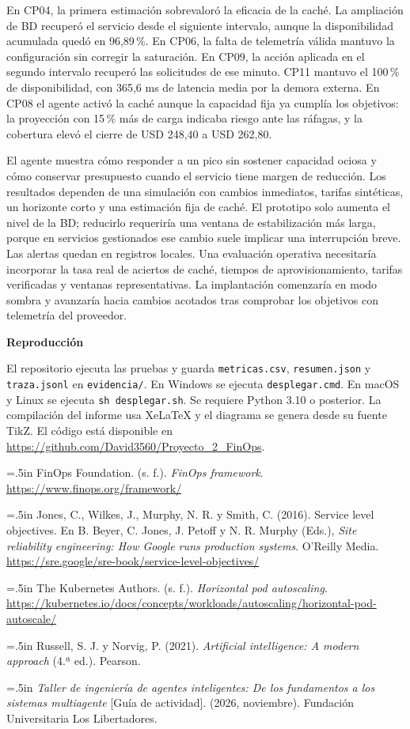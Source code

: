 \documentclass[12pt,letterpaper]{article}
\newcommand{\niveluno}[1]{\par\vspace{.35\baselineskip}\noindent\makebox[\linewidth][c]{\textbf{#1}}\par}
\newcommand{\niveldos}[1]{\par\vspace{.25\baselineskip}\noindent\textbf{#1}\par}
\newcommand{\entrada}[1]{\par\noindent\hangindent=.5in\hangafter=1 #1\par}
\begin{document}
En CP04, la primera estimación sobrevaloró la eficacia de la caché. La ampliación de BD recuperó el servicio desde el siguiente intervalo, aunque la disponibilidad acumulada quedó en 96,89\,\%. En CP06, la falta de telemetría válida mantuvo la configuración sin corregir la saturación. En CP09, la acción aplicada en el segundo intervalo recuperó las solicitudes de ese minuto. CP11 mantuvo el 100\,\% de disponibilidad, con 365,6 ms de latencia media por la demora externa. En CP08 el agente activó la caché aunque la capacidad fija ya cumplía los objetivos: la proyección con 15\,\% más de carga indicaba riesgo ante las ráfagas, y la cobertura elevó el cierre de USD 248,40 a USD 262,80.

El agente muestra cómo responder a un pico sin sostener capacidad ociosa y cómo conservar presupuesto cuando el servicio tiene margen de reducción. Los resultados dependen de una simulación con cambios inmediatos, tarifas sintéticas, un horizonte corto y una estimación fija de caché. El prototipo solo aumenta el nivel de la BD; reducirlo requeriría una ventana de estabilización más larga, porque en servicios gestionados ese cambio suele implicar una interrupción breve. Las alertas quedan en registros locales. Una evaluación operativa necesitaría incorporar la tasa real de aciertos de caché, tiempos de aprovisionamiento, tarifas verificadas y ventanas representativas. La implantación comenzaría en modo sombra y avanzaría hacia cambios acotados tras comprobar los objetivos con telemetría del proveedor.

\niveldos{Reproducción}
El repositorio ejecuta las pruebas y guarda \texttt{metricas.csv}, \texttt{resumen.json} y \texttt{traza.jsonl} en \texttt{evidencia/}. En Windows se ejecuta \texttt{desplegar.cmd}. En macOS y Linux se ejecuta \texttt{sh desplegar.sh}. Se requiere Python 3.10 o posterior. La compilación del informe usa XeLaTeX y el diagrama se genera desde su fuente TikZ. El código está disponible en \url{https://github.com/David3560/Proyecto_2_FinOps}.

\newpage
\niveluno{Referencias}

\entrada{FinOps Foundation. (s. f.). \textit{FinOps framework}. \url{https://www.finops.org/framework/}}
\entrada{Jones, C., Wilkes, J., Murphy, N. R. y Smith, C. (2016). Service level objectives. En B. Beyer, C. Jones, J. Petoff y N. R. Murphy (Eds.), \textit{Site reliability engineering: How Google runs production systems}. O’Reilly Media. \url{https://sre.google/sre-book/service-level-objectives/}}
\entrada{The Kubernetes Authors. (s. f.). \textit{Horizontal pod autoscaling}. \url{https://kubernetes.io/docs/concepts/workloads/autoscaling/horizontal-pod-autoscale/}}
\entrada{Russell, S. J. y Norvig, P. (2021). \textit{Artificial intelligence: A modern approach} (4.ª ed.). Pearson.}
\entrada{\textit{Taller de ingeniería de agentes inteligentes: De los fundamentos a los sistemas multiagente} [Guía de actividad]. (2026, noviembre). Fundación Universitaria Los Libertadores.}
\end{document}

